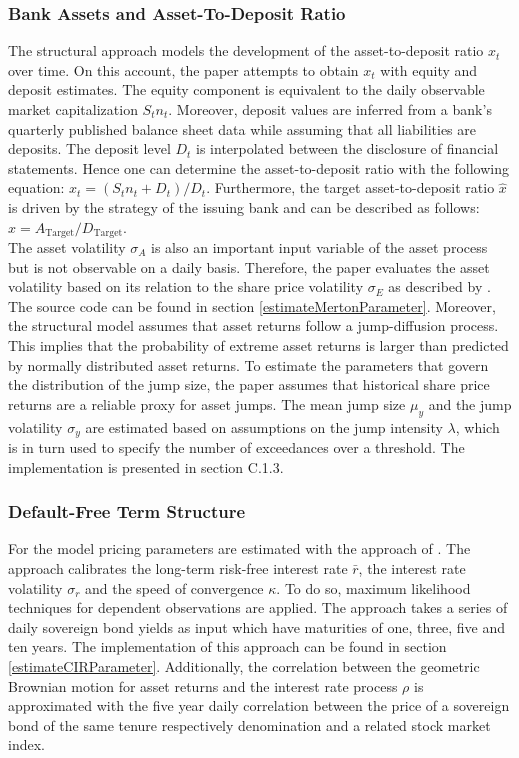 \subsubsection*{Bank Assets and Asset-To-Deposit Ratio}
The structural approach models the development of the asset-to-deposit ratio $x_t$ over time. On this account, the paper attempts to obtain $x_t$ with equity and deposit estimates. The equity component is equivalent to the daily observable market capitalization $S_t n_t$. Moreover, deposit values are inferred from a bank's quarterly published balance sheet data while assuming that all liabilities are deposits. The deposit level $D_t$ is interpolated between the disclosure of financial statements. \citep{wilkens2014contingent} Hence one can determine the asset-to-deposit ratio with the following equation: $x_t = (S_t n_t + D_t)/D_t$. Furthermore, the target asset-to-deposit ratio $\hat{x}$ is driven by the strategy of the issuing bank and can be described as follows: $\hat{x} = A_\text{Target}/D_\text{Target}$.\\

The asset volatility $\sigma_A$ is also an important input variable of the asset process but is not observable on a daily basis. Therefore, the paper evaluates the asset volatility based on its relation to the share price volatility $\sigma_E$ as described by \citet{merton1974pricing}. The source code can be found in section \ref{estimateMertonParameter}. Moreover, the structural model assumes that asset returns follow a jump-diffusion process. This implies that the probability of extreme asset returns is larger than predicted by normally distributed asset returns. To estimate the parameters that govern the distribution of the jump size, the paper assumes that historical share price returns are a reliable proxy for asset jumps. The mean jump size $\mu_y$ and the jump volatility $\sigma_y$ are estimated based on assumptions on the jump intensity $\lambda$, which is in turn used to specify the number of exceedances over a threshold. \citep{longin2001extreme} The implementation is presented in section C.1.3.

\subsubsection*{Default-Free Term Structure}
For the \citet{cox1985theory} model pricing parameters are estimated with the approach of \citet{remillard2013statistical}. The approach calibrates the long-term risk-free interest rate $\bar{r}$, the interest rate volatility $\sigma_r$ and the speed of convergence $\kappa$. To do so, maximum likelihood techniques for dependent observations are applied. The approach takes a series of daily sovereign bond yields as input which have maturities of one, three, five and ten years. The implementation of this approach can be found in section \ref{estimateCIRParameter}. Additionally, the correlation between the geometric Brownian motion for asset returns and the interest rate process $\rho$ is approximated with the five year daily correlation between the price of a sovereign bond of the same tenure respectively denomination and a related stock market index.

